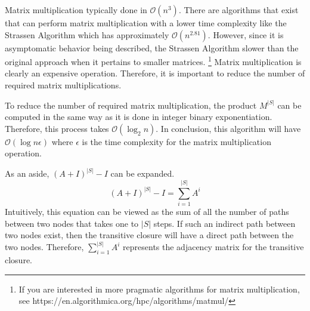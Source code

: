 Matrix multiplication typically done in \(\mathcal{O}(n^3)\). There are algorithms that exist that can perform matrix multiplication
with a lower time complexity like the Strassen Algorithm which has approximately \(\mathcal{O}(n^{2.81})\). However, since it is 
asymptomatic behavior being described, the Strassen Algorithm slower than the original approach when it pertains to smaller matrices.
\footnote{If you are interested in more pragmatic algorithms for matrix multiplication, see https://en.algorithmica.org/hpc/algorithms/matmul/}
Matrix multiplication is clearly an expensive operation. Therefore, it is important to reduce the number of required matrix multiplications.

To reduce the number of required matrix multiplication, the product \(M^{|S|}\) can be computed in the same way as it is done in integer
binary exponentiation. Therefore, this process takes \(\mathcal{O}(\log_2n)\). In conclusion, this algorithm will have 
\(\mathcal{O}(\log n\epsilon)\) where \(\epsilon\) is the time complexity for the matrix multiplication operation. 

As an aside, \((A+I)^{|S|}-I\) can be expanded.
\[(A+I)^{|S|}-I=\sum_{i=1}^{|S|}A^i\]
Intuitively, this equation can be viewed as the sum of all the number of paths between two nodes that takes one to \(|S|\) steps.
If such an indirect path between two nodes exist, then the transitive closure will have a direct path between the two nodes. Therefore,
\(\sum_{i=1}^{|S|}A^i\) represents the adjacency matrix for the transitive closure.